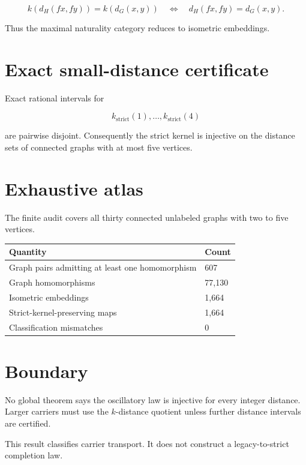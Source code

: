 \documentclass[11pt,a4paper,openany]{report}
\begin{document}
\[
k(d_H(fx,fy))=k(d_G(x,y))
\quad\Longleftrightarrow\quad
d_H(fx,fy)=d_G(x,y).
\]

Thus the maximal naturality category reduces to isometric embeddings.

\section{Exact small-distance certificate}

Exact rational intervals for

\[
k_{\mathrm{strict}}(1),\ldots,k_{\mathrm{strict}}(4)
\]

are pairwise disjoint. Consequently the strict kernel is injective on the distance sets of connected graphs with at most five vertices.

\section{Exhaustive atlas}

The finite audit covers all thirty connected unlabeled graphs with two to five vertices.

\begin{center}
\begingroup\small
\setlength{\tabcolsep}{2.5pt}
\renewcommand{\arraystretch}{1.16}
\begin{longtable}{@{}p{}p{}@{}}
\toprule
\textbf{Quantity} & \textbf{Count} \\
\midrule
\endhead
Graph pairs admitting at least one homomorphism & 607 \\
Graph homomorphisms & 77,130 \\
Isometric embeddings & 1,664 \\
Strict-kernel-preserving maps & 1,664 \\
Classification mismatches & 0 \\
\bottomrule
\end{longtable}
\endgroup
\end{center}

\section{Boundary}

No global theorem says the oscillatory law is injective for every integer distance. Larger carriers must use the \(k\)-distance quotient unless further distance intervals are certified.

This result classifies carrier transport. It does not construct a legacy-to-strict completion law.
\end{document}
